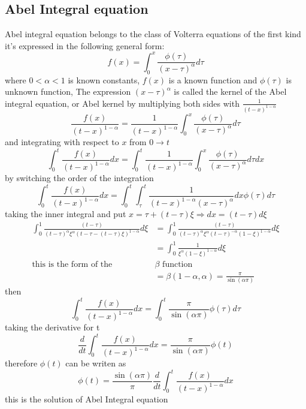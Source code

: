 \documentclass[]{article}
\begin{document}
\newpage


\subsection{Abel Integral equation}
Abel integral equation belongs to the class of Volterra equations of the first kind
it's expressed in the following general form:
\[
f(x) = \int_{0}^{x} \frac{\phi(\tau)}{{(x-\tau )}^\alpha} d\tau
\]
where $0<\alpha<1$ is known constants, $f(x)$ is a known function and $\phi(\tau)$ is unknown function,
The expression ${(x-\tau )}^\alpha$  is called the kernel of the Abel integral equation, or Abel kernel
by multiplying both sides with $\displaystyle \frac{1}{{(t-x)}^{1-\alpha}}$
\[
\frac{f(x)}{{(t-x)}^{1-\alpha}} = \frac{1}{{(t-x)}^{1-\alpha}} \int_{0}^{x} \frac{\phi(\tau)}{{(x-\tau)}^\alpha} d\tau
\]
and integrating with respect to $x$ from $0 \to t$
\[
\int_{0}^{t} \frac{f(x)}{{(t-x)}^{1-\alpha}} dx=  \int_{0}^{t} \frac{1}{{(t-x)}^{1-\alpha}} \int_{0}^{x} \frac{\phi(\tau)}{{(x-\tau)}^\alpha} d\tau dx
\]
by switching the order of the integration 
\[
\int_{0}^{t} \frac{f(x)}{{(t-x)}^{1-\alpha}} dx= \int_{0}^{t}\int_{\tau}^{t} \frac{1}{{(t-x)}^{1-\alpha}{(x-\tau)}^\alpha} dx \phi(\tau) d\tau
\]
taking the inner integral and put $x = \tau + (t-\tau)\xi \Longrightarrow dx = (t-\tau)d\xi$
\begin{align*}
    \int_{0}^{1} \frac{(t-\tau)}{{(t-\tau)}^\alpha \xi^\alpha {(t-\tau-(t-\tau)\xi)}^{1-\alpha}} d\xi 
    &= \int_{0}^{1} \frac{(t-\tau)}{{(t-\tau)}^\alpha \xi^\alpha {(t-\tau)}^{-\alpha}{(1-\xi)}^{1-\alpha}} d\xi
    \\
    &= \int_{0}^{1} \frac{1}{\xi^{\alpha} {(1-\xi)}^{1-\alpha} } d\xi
    \\
    \text{this is the form of the } &\beta \text{ function }    
    \\
    &=\beta (1-\alpha,\alpha) = \frac{\pi}{\sin(\alpha\pi)}
\end{align*}
then
\[
\int_{0}^{t} \frac{f(x)}{{(t-x)}^{1-\alpha}} dx = \int_{0}^{t} \frac{\pi}{\sin(\alpha\pi)} \phi(\tau) d\tau
\]
taking the derivative for t 
\[
\frac{d}{dt} \int_{0}^{t} \frac{f(x)}{{(t-x)}^{1-\alpha}} dx = \frac{\pi}{\sin(\alpha\pi)} \phi(t)
\]
therefore $\phi(t)$ can be writen as 
\[
\phi(t) = \frac{\sin(\alpha\pi)}{\pi}  \frac{d}{dt} \int_{0}^{t} \frac{f(x)}{{(t-x)}^{1-\alpha}} dx
\]
this is the solution of Abel Integral equation

\newpage
\end{document}
